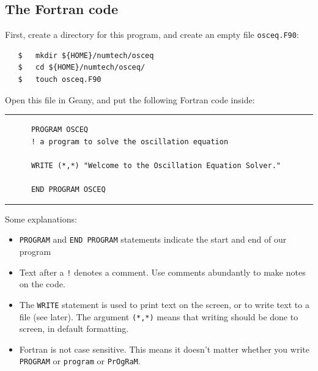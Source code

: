 \documentclass[a4paper]{article}
\begin{document}
\subsection{The Fortran code}
%
\par
First, create a directory for this program, and create an empty file \texttt{osceq.F90}:
%
\begin{verbatim}
   $   mkdir ${HOME}/numtech/osceq
   $   cd ${HOME}/numtech/osceq/
   $   touch osceq.F90
\end{verbatim}
%
\par
Open this file in Geany, and put the following Fortran code inside:
%
{\vspace{10pt}\hrule\small\vspace*{-2pt}\begin{verbatim}
	  PROGRAM OSCEQ
	  ! a program to solve the oscillation equation
	  
	  WRITE (*,*) "Welcome to the Oscillation Equation Solver."
	  
	  END PROGRAM OSCEQ
\end{verbatim}\hrule\vspace{5pt}}
%
Some explanations:
%
\begin{itemize}
	\item \verb+PROGRAM+ and \verb+END PROGRAM+ statements indicate the start and end of our program
	\item Text after a \verb+!+ denotes a comment. Use comments abundantly to make notes on the code.
	\item The \verb+WRITE+ statement is used to print text on the screen, or to write text to a file (see later). The argument \verb+(*,*)+ means that writing should be done to screen, in default formatting.
	\item Fortran is not case sensitive. This means it doesn't matter whether you write \verb+PROGRAM+ or \verb+program+ or \verb+PrOgRaM+.
\end{itemize}
%
\end{document}
